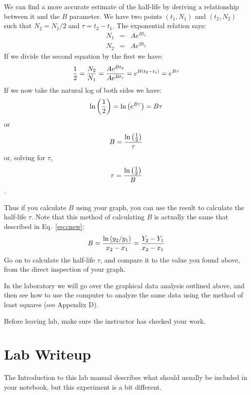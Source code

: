 \begin{enumerate}
We can find a more accurate estimate of the half-life by deriving a 
relationship between it and the $B$ parameter.
We have two points $(t_1,N_1)$ and $(t_2,N_2)$ such that
$N_2=N_1/2$ and $\tau=t_2-t_1$.  The exponential relation says:
\begin{eqnarray*}
N_1&=&A e^{Bt_1}\\
N_2&=&Ae^{Bt_2}
\end{eqnarray*}
If we divide the second equation by the first we have:
\[{1\over 2} =  {N_2\over N_1} = {Ae^{Bt_2} \over Ae^{Bt_1}} = e^{B(t_2-t_1)} =
e^{B\tau} \]
If we now take the natural log of both sides we have:
\[\ln\left({1\over 2}\right) = \ln\left(e^{B\tau}\right) = B\tau \]
or
\[B = {\ln\left({1\over 2}\right) \over \tau} \]
or, solving for $\tau$,
\[\tau = {\ln\left({1\over 2}\right) \over B} \].

Thus if you calculate $B$ using your graph, you can use the result 
to calculate the half-life $\tau$.
Note that this method of calculating $B$ is actually the same that
described in Eq.~\ref{eq:cnew}:
\[
B = 
{\ln\left(y_{2}/y_{1}\right) \over x_{2} - x_{1}} =
{Y_{2}-Y_{1} \over x_{2} - x_{1}}
\]
Go on to calculate the half-life $\tau$, and compare it to the value
you found above, from the direct inspection of your graph.

\end{enumerate}
    In the laboratory we will go over the graphical data analysis
outlined above, and then see how to use the computer to analyze
the same data using the method of least squares (see Appendix D).

    Before leaving lab, make sure the instructor has checked your
work.

\section*{Lab Writeup}

The Introduction to this lab manual describes what should
usually be included in your notebook, but this experiment is
a bit different.

